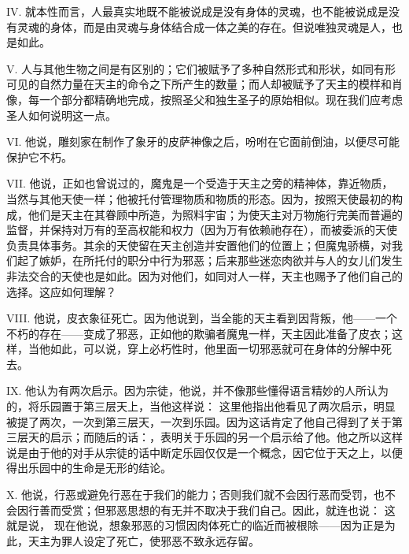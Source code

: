 IV. 就本性而言，人最真实地既不能被说成是没有身体的灵魂，也不能被说成是没有灵魂的身体，而是由灵魂与身体结合成一体之美的存在。但说唯独灵魂是人，也是如此。\par

V. 人与其他生物之间是有区别的；它们被赋予了多种自然形式和形状，如同有形可见的自然力量在天主的命令之下所产生的数量；而人却被赋予了天主的模样和肖像，每一个部分都精确地完成，按照圣父和独生圣子的原始相似。现在我们应考虑圣人如何说明这一点。\par

VI. 他说，雕刻家在制作了象牙的皮萨神像之后，吩咐在它面前倒油，以便尽可能保护它不朽。\par

VII. 他说，正如也曾说过的，魔鬼是一个受造于天主之旁的精神体，靠近物质，当然与其他天使一样；他被托付管理物质和物质的形态。因为，按照天使最初的构成，他们是天主在其眷顾中所造，为照料宇宙；为使天主对万物施行完美而普遍的监督，并保持对万有的至高权能和权力（因为万有依赖祂存在），而被委派的天使负责具体事务。其余的天使留在天主创造并安置他们的位置上；但魔鬼骄横，对我们起了嫉妒，在所托付的职分中行为邪恶；后来那些迷恋肉欲并与人的女儿们发生非法交合的天使也是如此。因为对他们，如同对人一样，天主也赐予了他们自己的选择。这应如何理解？\par

VIII. 他说，皮衣象征死亡。因为他说到，当全能的天主看到因背叛，他——一个不朽的存在——变成了邪恶，正如他的欺骗者魔鬼一样，天主因此准备了皮衣；这样，当他如此，可以说，穿上必朽性时，他里面一切邪恶就可在身体的分解中死去。\par

IX. 他认为有两次启示。因为宗徒，他说，并不像那些懂得语言精妙的人所认为的，将乐园置于第三层天上，当他这样说： 这里他指出他看见了两次启示，明显被提了两次，一次到第三层天，一次到乐园。因为这话肯定了他自己得到了关于第三层天的启示；而随后的话：，表明关于乐园的另一个启示给了他。他之所以这样说是由于他的对手从宗徒的话中断定乐园仅仅是一个概念，因它位于天之上，以便得出乐园中的生命是无形的结论。\par

X. 他说，行恶或避免行恶在于我们的能力；否则我们就不会因行恶而受罚，也不会因行善而受赏；但邪恶思想的有无并不取决于我们自己。因此，就连也说： 这就是说， 现在他说，想象邪恶的习惯因肉体死亡的临近而被根除——因为正是为此，天主为罪人设定了死亡，使邪恶不致永远存留。\par

